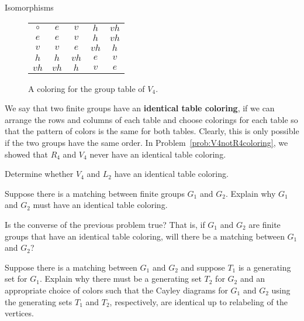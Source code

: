 \begin{section}{Isomorphisms}
\begin{figure}[!ht]
\centering
\begin{tabular}{c!{\vrule width 2pt}c|c|c|c}
$\circ$ & $e$ & $v$ & $h$ & $vh$ \\ 
$e$ & $e$ & $v$ & $h$ & $vh$ \\
\hline {}$v$ & $v$ & $e$ & $vh$ & $h$  \\
\hline {}$h$ & $h$ & $vh$ & $e$ & $v$\\
\hline {}$vh$ & $vh$ & $h$ & $v$ & $e$
\end{tabular}
\caption{A coloring for the group table of $V_4$.}\label{fig:V4coloring}
\end{figure}

We say that two finite groups have an \textbf{identical table coloring}, if we can arrange the rows and columns of each table and choose colorings for each table so that the pattern of colors is the same for both tables.  Clearly, this is only possible if the two groups have the same order. In Problem~\ref{prob:V4notR4coloring}, we showed that $R_4$ and $V_4$ never have an identical table coloring.

\begin{problem}
Determine whether $V_4$ and $L_2$ have an identical table coloring.
\end{problem}

\begin{problem}
Suppose there is a matching between finite groups $G_1$ and $G_2$.  Explain why $G_1$ and $G_2$ must have an identical table coloring.
\end{problem}

\begin{problem}
Is the converse of the previous problem true?  That is, if $G_1$ and $G_2$ are finite groups that have an identical table coloring, will there be a matching between $G_1$ and $G_2$?
\end{problem}

\begin{problem}
Suppose there is a matching between $G_1$ and $G_2$ and suppose $T_1$ is a generating set for $G_1$. Explain why there must be a generating set $T_2$ for $G_2$ and an appropriate choice of colors such that the Cayley diagrams for $G_1$ and $G_2$ using the generating sets $T_1$ and $T_2$, respectively, are identical up to relabeling of the vertices.
\end{problem}


\end{section}
